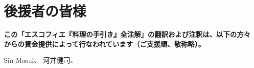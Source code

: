 \hypertarget{benefactors}{%
\section{後援者の皆様}\label{benefactors}}

\thispagestyle{empty}

\textbf{この「エスコフィエ『料理の手引き』全注解」の翻訳および注釈は、以下の方々からの資金提供によって行なわれています（ご支援順、敬称略）。}

Sin Masui、\href{20180524-23h,2x}{} 河井健司、\href{20180525-0h14,10x}{}
